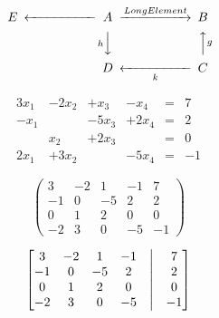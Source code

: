 \documentclass{article}
\begin{document}
	\[ \minCDarrowwidth2cm
	\begin{CD}
		E   @<<< A 	@>Long Element>> B 	  \\
		@.	@VhVV     @AAgA   \\
		@.	D	@<<k< 	C  	  \\
	\end{CD} 
	\]
		
	
	
	\bigskip

                
    \bigskip 
                
    \[
		\begin{matrix}
           3x_1 & -2x_2 &  +x_3 &  -x_4 & = & 7\\
           -x_1 &       & -5x_3 & +2x_4 & = & 2\\
                &   x_2 & +2x_3 &       & = & 0\\
           2x_1 & +3x_2 &       & -5x_4 & = & -1
        \end{matrix}   
    \]
    
    \[
		\left( \begin{array}{cccc|c}
             3 & -2 &  1 & -1 &  7\\
            -1 &  0 & -5 &  2 &  2\\
             0 &  1 &  2 &  0 &  0\\ 
            -2 &  3 &  0 & -5 & -1
          \end{array} \right)    
    \]
	
	\[
		\begin{bmatrix}
		    3  & -2 &  1 & -1 & \bigm| & 7  \\
		    -1 &  0 & -5 &  2 & \bigm| & 2  \\
		    0  &  1 &  2 &  0 & \bigm| & 0  \\ 
		    -2 &  3 &  0 & -5 & \bigm| & -1
		\end{bmatrix}
	\]
	
\end{document}
